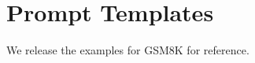 \section{Prompt Templates}
\label{sec:softcot-appendix-templates}

We release the examples for GSM8K for reference.


%
%
%
%
%
%
%
%
%
%
%
%



